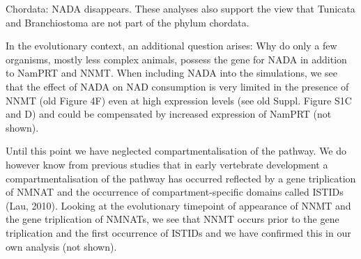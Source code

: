\documentclass[paper=a4, 12pt]{scrartcl}
\begin{document}
Chordata: NADA disappears. These analyses also support the view that Tunicata and Branchiostoma are not part of the phylum chordata.

In the evolutionary context, an additional question arises: Why do only a few organisms, mostly less complex animals, possess the gene for NADA in addition to NamPRT and NNMT. When including NADA into the simulations, we see that the effect of NADA on NAD consumption is very limited in the presence of NNMT (old Figure 4F) even at high expression levels (see old Suppl. Figure S1C and D) and could be compensated by increased expression of NamPRT (not shown).

Until this point we have neglected compartmentalisation of the pathway. We do however know from previous studies that in early vertebrate development a compartmentalisation of the pathway has occurred reflected by a gene triplication of NMNAT and the occurrence of compartment-specific domains called ISTIDs (Lau, 2010). Looking at the evolutionary timepoint  of appearance of NNMT and the gene triplication of NMNATs, we see that NNMT occurs prior to the gene triplication and the first occurrence of ISTIDs and we have confirmed this in our own analysis (not shown).
\end{document}
